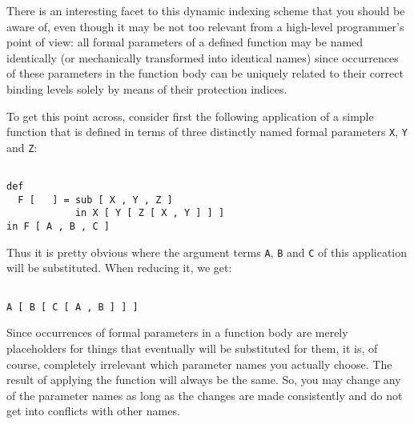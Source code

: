 There is an interesting facet to this dynamic indexing scheme that you
should be aware of,  even though it may be not too relevant from a
high-level programmer's point of view: 
all formal parameters of a defined function may be named
 identically (or mechanically transformed into identical names) 
since occurrences of these parameters in the function body
 can be uniquely related to their correct binding levels solely by means
of their protection indices. 

To get this point across, consider first the following 
 application of a simple function that is defined in terms of three
distinctly named formal parameters {\tt X}, {\tt Y} and {\tt Z}:
\begin{verbatim}
  
def 
  F [   ] = sub [ X , Y , Z ]
            in X [ Y [ Z [ X , Y ] ] ]
in F [ A , B , C ]

\end{verbatim}
 Thus it is pretty obvious where
the argument terms {\tt A}, {\tt B} and {\tt C} of this application will
be substituted. When reducing it, we get:
\begin{verbatim}

A [ B [ C [ A , B ] ] ]

\end{verbatim}
Since occurrences of formal parameters in a function body are merely
{\mys placeholders} for things that eventually will be substituted for them,
it is, of course,
 completely irrelevant which parameter names you actually choose. The result
of applying the function will always be the same.
So, you may change any of the parameter names as long as the changes are
made consistently and do not get into  conflicts with other names.

